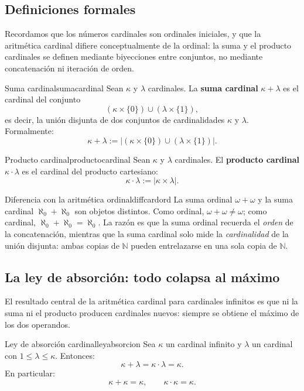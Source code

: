 \subsection{Definiciones formales}

Recordamos que los números cardinales son ordinales iniciales, y que la aritmética cardinal difiere conceptualmente de la ordinal: la suma y el producto cardinales se definen mediante biyecciones entre conjuntos, no mediante concatenación ni iteración de orden.

\begin{definicion}{Suma cardinal}{sumacardinal}
Sean $\kappa$ y $\lambda$ cardinales. La \textbf{suma cardinal} $\kappa + \lambda$ es el cardinal del conjunto
\[
  (\kappa \times \{0\}) \cup (\lambda \times \{1\}),
\]
es decir, la unión disjunta de dos conjuntos de cardinalidades $\kappa$ y $\lambda$. Formalmente:
\[
  \kappa + \lambda := \bigl|(\kappa \times \{0\}) \cup (\lambda \times \{1\})\bigr|.
\]
\end{definicion}

\begin{definicion}{Producto cardinal}{productocardinal}
Sean $\kappa$ y $\lambda$ cardinales. El \textbf{producto cardinal} $\kappa \cdot \lambda$ es el cardinal del producto cartesiano:
\[
  \kappa \cdot \lambda := |\kappa \times \lambda|.
\]
\end{definicion}

\begin{observacion}{Diferencia con la aritmética ordinal}{diffcardord}
La suma ordinal $\omega + \omega$ y la suma cardinal $\aleph_0 + \aleph_0$ son objetos distintos. Como ordinal, $\omega + \omega \neq \omega$; como cardinal, $\aleph_0 + \aleph_0 = \aleph_0$. La razón es que la suma ordinal recuerda el \emph{orden} de la concatenación, mientras que la suma cardinal solo mide la \emph{cardinalidad} de la unión disjunta: ambas copias de $\mathbb{N}$ pueden entrelazarse en una sola copia de $\mathbb{N}$.
\end{observacion}

\subsection{La ley de absorción: todo colapsa al máximo}

El resultado central de la aritmética cardinal para cardinales infinitos es que ni la suma ni el producto producen cardinales nuevos: siempre se obtiene el máximo de los dos operandos.

\begin{teorema}{Ley de absorción cardinal}{leyabsorcion}
Sea $\kappa$ un cardinal infinito y $\lambda$ un cardinal con $1 \leq \lambda \leq \kappa$. Entonces:
\[
  \kappa + \lambda = \kappa \cdot \lambda = \kappa.
\]
En particular:
\[
  \kappa + \kappa = \kappa, \qquad \kappa \cdot \kappa = \kappa.
\]
\end{teorema}

